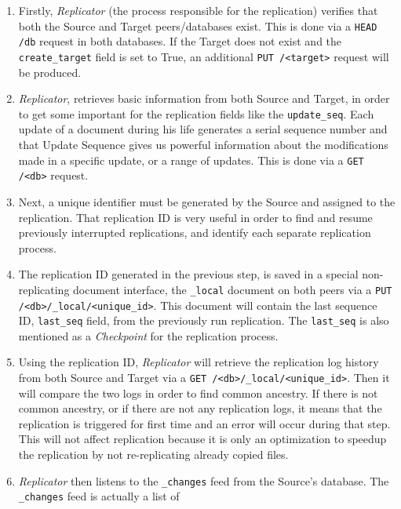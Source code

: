 \begin{description}
    \begin{enumerate}
      \item Firstly, \emph{Replicator} (the process responsible for the
      replication) verifies that both the Source and Target peers/databases
      exist. This is done via a \texttt{HEAD /{db}} request in both databases.
      If the Target does not exist and the \texttt{create\_target} field is set
      to True, an additional \texttt{PUT /<target>} request will be produced.
      \item \emph{Replicator}, retrieves basic information from both Source and
      Target, in order to get some important for the replication fields like the
      \texttt{update\_seq}. Each update of a document during his life generates
      a serial sequence number and that Update Sequence gives us powerful
      information about the modifications made in a specific update, or a range
      of updates. This is done via a \texttt{GET /<db>} request.
      \item Next, a unique identifier must be generated by the Source and
      assigned to the replication. That replication ID is very useful in order
      to find and resume previously interrupted replications, and identify each
      separate replication process.
      \item The replication ID generated in the previous step, is saved in a
      special non-replicating document interface, the \texttt{\_local} document
      on both peers via a \texttt{PUT /<db>/\_local/<unique\_id>}. This document
      will contain the last sequence ID, \texttt{last\_seq} field, from the
      previously run replication. The \texttt{last\_seq} is also mentioned as a
      \emph{Checkpoint} for the replication process.
      \item Using the replication ID, \emph{Replicator} will retrieve the
      replication log history from both Source and Target via a \texttt{GET
      /<db>/\_local/<unique\_id>}. Then it will compare the two logs in order to
      find common ancestry. If there is not common ancestry, or if there are not
      any replication logs, it means that the replication is triggered for
      first time and an error will occur during that step. This will not affect
      replication because it is only an optimization to speedup the replication
      by not re-replicating already copied files.
      \item \emph{Replicator} then listens to the \texttt{\_changes} feed from the
      Source's database. The \texttt{\_changes} feed is actually a list of

\end{enumerate}
\end{description}
